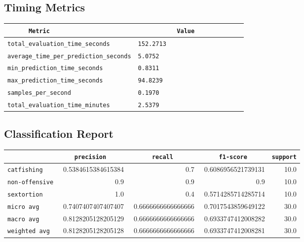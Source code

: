 \documentclass{article}
\begin{document}
\subsection{Timing Metrics}

\begin{center}
\begin{tabular}{l | l} \hline
    \verb|      Metric     | & \verb|           Value           | \\ \hline
    \hline
    \verb|total_evaluation_time_seconds| & \verb|152.2713                     | \\ \hline
    \verb|average_time_per_prediction_seconds| & \verb|5.0752                       | \\ \hline
    \verb|min_prediction_time_seconds| & \verb|0.8311                       | \\ \hline
    \verb|max_prediction_time_seconds| & \verb|94.8239                      | \\ \hline
    \verb|samples_per_second| & \verb|0.1970                       | \\ \hline
    \verb|total_evaluation_time_minutes| & \verb|2.5379                       | \\ \hline
\end{tabular}
\end{center}

\subsection{Classification Report}

\begin{center}
\begin{tabular}{l | r | r | r | r} \hline
    \verb|            | & \verb|    precision     | & \verb|      recall      | & \verb|     f1-score     | & \verb|support| \\ \hline
    \hline
    \verb|catfishing | & 0.5384615384615384 & 0.7 & 0.6086956521739131 &    10.0 \\ \hline
    \verb|non-offensive| & 0.9 & 0.9 & 0.9 &    10.0 \\ \hline
    \verb|sextortion | & 1.0 & 0.4 & 0.5714285714285714 &    10.0 \\ \hline
    \verb|micro avg  | & 0.7407407407407407 & 0.6666666666666666 & 0.7017543859649122 &    30.0 \\ \hline
    \verb|macro avg  | & 0.8128205128205129 & 0.6666666666666666 & 0.6933747412008282 &    30.0 \\ \hline
    \verb|weighted avg| & 0.8128205128205128 & 0.6666666666666666 & 0.6933747412008281 &    30.0 \\ \hline
\end{tabular}
\end{center}
\end{document}
